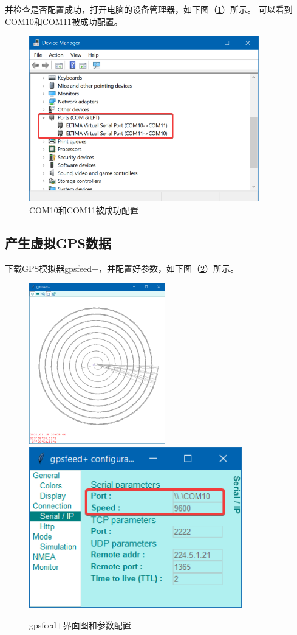 \documentclass[UTF-8, a4paper, 12pt]{ctexart}
\begin{document}
并检查是否配置成功，打开电脑的设备管理器，如下图（\ref{f3}）所示。
可以看到COM10和COM11被成功配置。
\begin{figure}[htbp]
    \centering
    \includegraphics[width=10cm]{figs/f3.png}
    \caption{COM10和COM11被成功配置}
    \label{f3}
\end{figure}
\subsection{产生虚拟GPS数据}
下载GPS模拟器gpsfeed+，并配置好参数，如下图（\ref{f45}）所示。
\begin{figure}[htbp]
    \centering
    \includegraphics[height=7cm]{figs/f4.png}
    \includegraphics[height=7cm]{figs/f5.png}
    \caption{gpsfeed+界面图和参数配置}
    \label{f45}
\end{figure}
\end{document}
